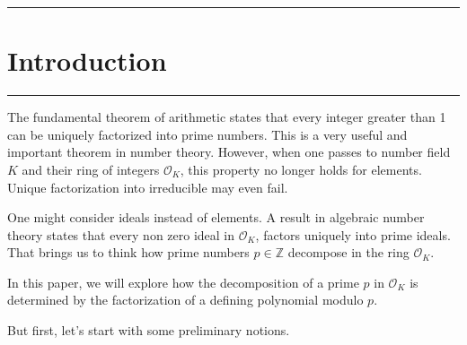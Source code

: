 \medskip
{\color{gray}\hrule}
\section{Introduction}

\medskip 
{\color{gray}\hrule}
\medskip
The fundamental theorem of arithmetic states that every integer greater than 1 can be uniquely factorized into prime numbers. 
This is a very useful and important theorem in number theory. 
However, when one passes to number field $K$ and their ring of integers $\mathcal{O}_K$, this property no longer holds for elements. 
Unique factorization into irreducible may even fail. 

\medskip 

One might consider ideals instead of elements. A result in algebraic number theory states that every non zero ideal in $\mathcal{O}_K$, factors uniquely into prime ideals. 
That brings us to think how prime numbers $p \in \mathbb{Z}$ decompose in the ring $\mathcal{O}_K$.

\medskip 

In this paper, we will explore how the decomposition of a prime $p$ in $\mathcal{O}_K$ is determined by the factorization of a defining polynomial modulo $p$.

\medskip 

But first, let's start with some preliminary notions. 